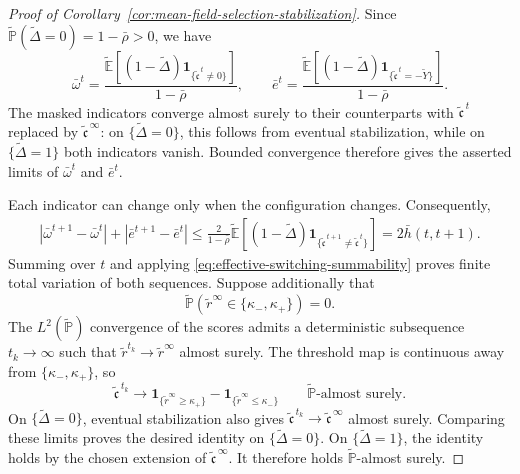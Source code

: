 \begin{proof}[Proof of Corollary~\ref{cor:mean-field-selection-stabilization}]
Since $\tilde{\mathbb P}(\tilde\Delta=0)=1-\bar\rho>0$, we have
\[
    \bar\omega^t
    =
    \frac{
        \tilde{\mathbb E}\left[
            (1-\tilde\Delta)
            \mathbf1_{\{\tilde{\mathfrak c}^{\,t}\neq0\}}
        \right]
    }{1-\bar\rho},
    \qquad
    \bar e^t
    =
    \frac{
        \tilde{\mathbb E}\left[
            (1-\tilde\Delta)
            \mathbf1_{\{\tilde{\mathfrak c}^{\,t}=-\tilde Y\}}
        \right]
    }{1-\bar\rho}.
\]
The masked indicators converge almost surely to their
counterparts with $\tilde{\mathfrak c}^{\,t}$ replaced by
$\tilde{\mathfrak c}^{\,\infty}$: on $\{\tilde\Delta=0\}$,
this follows from eventual stabilization, while on
$\{\tilde\Delta=1\}$ both indicators vanish.
Bounded convergence therefore gives the asserted limits
of $\bar\omega^t$ and $\bar e^t$.

Each indicator can change only when the configuration changes.
Consequently,
\[
\begin{aligned}
    |\bar\omega^{t+1}-\bar\omega^t|
      +|\bar e^{t+1}-\bar e^t|
    \leq
    \frac{2}{1-\bar\rho}
    \tilde{\mathbb E}\left[
        (1-\tilde\Delta)
        \mathbf1_{\{
            \tilde{\mathfrak c}^{\,t+1}
            \neq\tilde{\mathfrak c}^{\,t}
        \}}
    \right]
    =2\bar h(t,t+1).
\end{aligned}
\]
Summing over $t$ and applying
\eqref{eq:effective-switching-summability}
proves finite total variation of both sequences.
Suppose additionally that
\[
    \tilde{\mathbb P}
        (\tilde r^\infty\in\{\kappa_-,\kappa_+\})=0.
\]
The $L^2(\tilde{\mathbb P})$ convergence of the scores
admits a deterministic subsequence $t_k\to\infty$ such that
$\tilde r^{t_k}\to\tilde r^\infty$ almost surely.
The threshold map is continuous away from
$\{\kappa_-,\kappa_+\}$, so
\[
    \tilde{\mathfrak c}^{\,t_k}
    \longrightarrow
    \mathbf1_{\{\tilde r^\infty\geq\kappa_+\}}
    -
    \mathbf1_{\{\tilde r^\infty\leq\kappa_-\}}
    \qquad
    \tilde{\mathbb P}\text{-almost surely}.
\]
On $\{\tilde\Delta=0\}$, eventual stabilization also gives
$\tilde{\mathfrak c}^{\,t_k}
\to\tilde{\mathfrak c}^{\,\infty}$ almost surely.
Comparing these limits proves the desired identity on
$\{\tilde\Delta=0\}$.
On $\{\tilde\Delta=1\}$, the identity holds by the chosen
extension of $\tilde{\mathfrak c}^{\,\infty}$.
It therefore holds $\tilde{\mathbb P}$-almost surely.
\end{proof}
